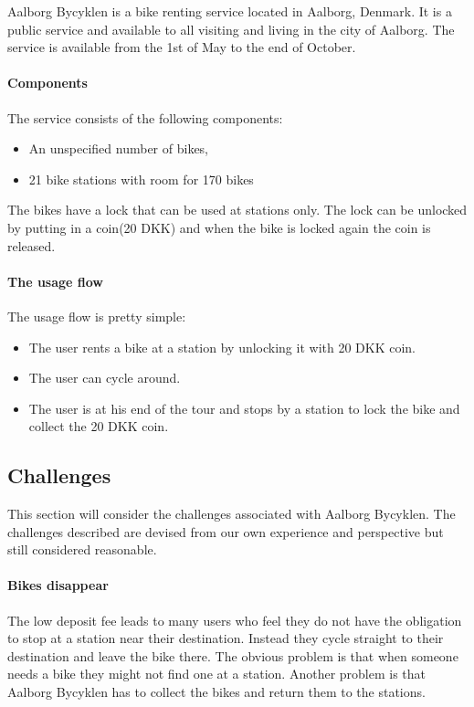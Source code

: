 \label{aalborg_bycyklen}
Aalborg Bycyklen is a bike renting service located in Aalborg, Denmark.
It is a public service and available to all visiting and living in the city of Aalborg.
The service is available from the 1st of May to the end of October.\cite{aalborgbycyklenbagcyklen}


\paragraph{Components}
The service consists of the following components:
\begin{itemize}
\item An unspecified number of bikes, 
\item 21 bike stations with room for 170 bikes
\end{itemize}
The bikes have a lock that can be used at stations only.
The lock can be unlocked by putting in a coin(20 DKK) and when the bike is locked again the coin is released.

\paragraph{The usage flow}
The usage flow is pretty simple:
\begin{itemize}
\item The user rents a bike at a station by unlocking it with 20 DKK coin.
\item The user can cycle around.
\item The user is at his end of the tour and stops by a station to lock the bike and collect the 20 DKK coin.
\end{itemize}

\subsection{Challenges}\label{aalborg_bycyklen:challenges}
This section will consider the challenges associated with Aalborg Bycyklen.
The challenges described are devised from our own experience and perspective but still considered reasonable.

\paragraph{Bikes disappear}
The low deposit fee leads to many users who feel they do not have the obligation to stop at a station near their destination.
Instead they cycle straight to their destination and leave the bike there.
The obvious problem is that when someone needs a bike they might not find one at a station.
Another problem is that Aalborg Bycyklen has to collect the bikes and return them to the stations.

